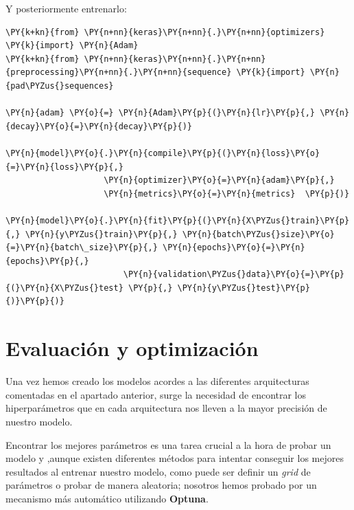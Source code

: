 Y posteriormente entrenarlo: 

\vspace{0.5cm}

    \begin{tcolorbox}[breakable, size=fbox, boxrule=1pt, pad at break*=1mm,colback=cellbackground, colframe=cellborder]
\begin{Verbatim}[commandchars=\\\{\}]
\PY{k+kn}{from} \PY{n+nn}{keras}\PY{n+nn}{.}\PY{n+nn}{optimizers} \PY{k}{import} \PY{n}{Adam}
\PY{k+kn}{from} \PY{n+nn}{keras}\PY{n+nn}{.}\PY{n+nn}{preprocessing}\PY{n+nn}{.}\PY{n+nn}{sequence} \PY{k}{import} \PY{n}{pad\PYZus{}sequences}

\PY{n}{adam} \PY{o}{=} \PY{n}{Adam}\PY{p}{(}\PY{n}{lr}\PY{p}{,} \PY{n}{decay}\PY{o}{=}\PY{n}{decay}\PY{p}{)}
        
\PY{n}{model}\PY{o}{.}\PY{n}{compile}\PY{p}{(}\PY{n}{loss}\PY{o}{=}\PY{n}{loss}\PY{p}{,}
                    \PY{n}{optimizer}\PY{o}{=}\PY{n}{adam}\PY{p}{,}
                    \PY{n}{metrics}\PY{o}{=}\PY{n}{metrics}  \PY{p}{)}

\PY{n}{model}\PY{o}{.}\PY{n}{fit}\PY{p}{(}\PY{n}{X\PYZus{}train}\PY{p}{,} \PY{n}{y\PYZus{}train}\PY{p}{,} \PY{n}{batch\PYZus{}size}\PY{o}{=}\PY{n}{batch\_size}\PY{p}{,} \PY{n}{epochs}\PY{o}{=}\PY{n}{epochs}\PY{p}{,}
                        \PY{n}{validation\PYZus{}data}\PY{o}{=}\PY{p}{(}\PY{n}{X\PYZus{}test} \PY{p}{,} \PY{n}{y\PYZus{}test}\PY{p}{)}\PY{p}{)} 
\end{Verbatim}
\end{tcolorbox}



\section{Evaluación y optimización}
\label{section:super:opt}
Una vez hemos creado los modelos acordes a las diferentes arquitecturas comentadas en el apartado anterior, surge la necesidad de encontrar los hiperparámetros que en cada arquitectura nos lleven a la mayor precisión de nuestro modelo.


Encontrar los mejores parámetros es una tarea crucial a la hora de probar un modelo y ,aunque existen diferentes métodos para intentar conseguir los mejores resultados al entrenar nuestro modelo, como puede ser definir un \textit{grid} de parámetros o probar de manera aleatoria; nosotros hemos probado por un mecanismo más automático utilizando \textbf{Optuna}.

